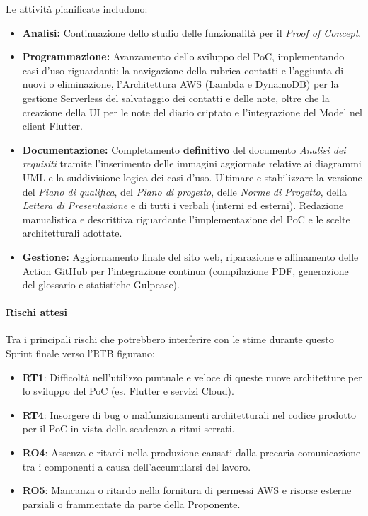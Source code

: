\documentclass[a4paper,12pt]{article}
\begin{document}
Le attività pianificate includono:
\begin{itemize}
    \item \textbf{Analisi:} Continuazione dello studio delle funzionalità per il \textit{Proof of Concept}.
    \item \textbf{Programmazione:} Avanzamento dello sviluppo del PoC, implementando casi d'uso riguardanti: la navigazione della rubrica contatti e l'aggiunta di nuovi o eliminazione, l'Architettura AWS (Lambda e DynamoDB) per la gestione Serverless del salvataggio dei contatti e delle note, oltre che la creazione della UI per le note del diario criptato e l'integrazione del Model nel client Flutter.
    \item \textbf{Documentazione:} Completamento \textbf{definitivo} del documento \textit{Analisi dei requisiti} tramite l'inserimento delle immagini aggiornate relative ai diagrammi UML e la suddivisione logica dei casi d'uso. Ultimare e stabilizzare la versione del \textit{Piano di qualifica}, del \textit{Piano di progetto}, delle \textit{Norme di Progetto}, della \textit{Lettera di Presentazione} e di tutti i verbali (interni ed esterni). Redazione manualistica e descrittiva riguardante l'implementazione del PoC e le scelte architetturali adottate.
    \item \textbf{Gestione:} Aggiornamento finale del sito web, riparazione e affinamento delle Action GitHub per l'integrazione continua (compilazione PDF, generazione del glossario e statistiche Gulpease).
\end{itemize}

\paragraph{Rischi attesi}
Tra i principali rischi che potrebbero interferire con le stime durante questo Sprint finale verso l'RTB figurano:
\begin{itemize}
    \item \textbf{RT1}: Difficoltà nell'utilizzo puntuale e veloce di queste nuove architetture per lo sviluppo del PoC (es. Flutter e servizi Cloud).
    \item \textbf{RT4}: Insorgere di bug o malfunzionamenti architetturali nel codice prodotto per il PoC in vista della scadenza a ritmi serrati.
    \item \textbf{RO4}: Assenza e ritardi nella produzione causati dalla precaria comunicazione tra i componenti a causa dell'accumularsi del lavoro.
    \item \textbf{RO5}: Mancanza o ritardo nella fornitura di permessi AWS e risorse esterne parziali o frammentate da parte della Proponente. %
\end{itemize}
\end{document}
